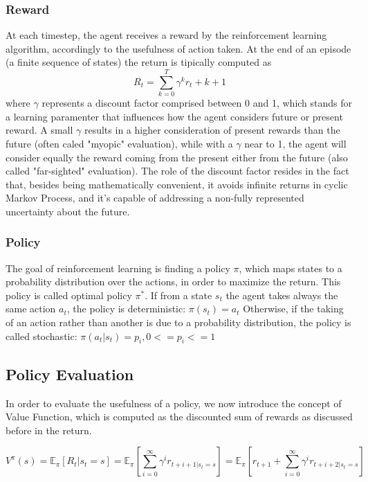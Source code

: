 \subsubsection{Reward}
At each timestep, the agent receives a reward by the reinforcement learning algorithm, accordingly to the usefulness of action taken.
At the end of an episode (a finite sequence of states) the return is tipically computed as \[R_t = \sum^{T}_{k=0}\gamma^k r_t + k +1\] where \(\gamma\) represents a discount factor comprised between 0 and 1, which stands for a learning paramenter that influences how the agent considers future                              or present reward. A small \(\gamma\) results in a higher consideration of present rewards than the future (often caled "myopic" evaluation), while with a \(\gamma\) near to 1, the agent will consider equally the reward coming from the present either from the future (also called "far-sighted" evaluation). The role of the discount factor resides in the fact that, besides being mathematically convenient, it avoids infinite returns in cyclic Markov Process, and it's capable of addressing a non-fully represented uncertainty about the future.

\subsubsection{Policy}
The goal of reinforcement learning is finding a policy \(\pi\), which maps states to a probability distribution over the actions, in order to maximize the return. This policy is called optimal policy \(\pi^*\).
If from a state \(s_t\) the agent takes always the same action \(a_t\), the policy is deterministic:
\(\pi(s_t) = a_t\)
Otherwise, if the taking of an action rather than another is due to a probability distribution, the policy is called stochastic:
\(\pi(a_t|s_t) = p_i, 0<=p_i<=1\)

\subsection{Policy Evaluation}
In order to evaluate the usefulness of a policy, we now introduce the concept of Value Function, which is computed as the discounted sum of rewards as discussed before in the return.


\[V^\pi(s) = \mathbb{E}_\pi{\left[R_t|s_t=s\right]}= \mathbb{E}_\pi\left[\sum^{\infty}_{i=0}\gamma^ir_{t+i+1|s_t=s}\right] = \mathbb{E}_\pi\left[r_{t+1} + \sum^{\infty}_{i=0}\gamma^ir_{t+i+2|s_t=s}\right]\]

